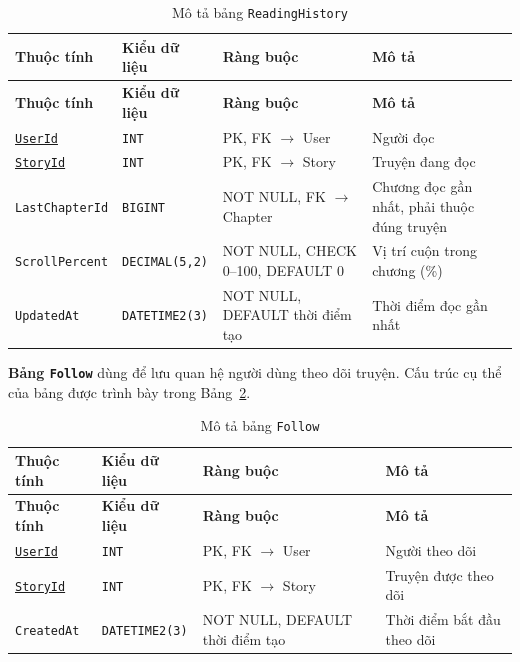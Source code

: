 {\small
\renewcommand{\arraystretch}{1.2}
\begin{longtable}{|>{\raggedright\arraybackslash}p{3.1cm}|>{\raggedright\arraybackslash}p{2.7cm}|>{\raggedright\arraybackslash}p{4.0cm}|>{\raggedright\arraybackslash}p{5.4cm}|}
\caption{Mô tả bảng \texttt{ReadingHistory}}\label{tab:db-reading-history}\\
\hline
\textbf{Thuộc tính} & \textbf{Kiểu dữ liệu} & \textbf{Ràng buộc} & \textbf{Mô tả} \\ \hline
\endfirsthead
\hline
\textbf{Thuộc tính} & \textbf{Kiểu dữ liệu} & \textbf{Ràng buộc} & \textbf{Mô tả} \\ \hline
\endhead
\underline{\texttt{UserId}} & \texttt{INT} & PK, FK $\rightarrow$ User & Người đọc \\ \hline
\underline{\texttt{StoryId}} & \texttt{INT} & PK, FK $\rightarrow$ Story & Truyện đang đọc \\ \hline
\texttt{LastChapterId} & \texttt{BIGINT} & NOT NULL, FK $\rightarrow$ Chapter & Chương đọc gần nhất, phải thuộc đúng truyện \\ \hline
\texttt{ScrollPercent} & \texttt{DECIMAL(5,2)} & NOT NULL, CHECK 0--100, DEFAULT 0 & Vị trí cuộn trong chương (\%) \\ \hline
\texttt{UpdatedAt} & \texttt{DATETIME2(3)} & NOT NULL, DEFAULT thời điểm tạo & Thời điểm đọc gần nhất \\ \hline
\end{longtable}
}

\textbf{Bảng \texttt{Follow}} dùng để lưu quan hệ người dùng theo dõi truyện. Cấu trúc cụ thể của bảng được trình bày trong Bảng~\ref{tab:db-follow}.


{\small
\renewcommand{\arraystretch}{1.2}
\begin{longtable}{|>{\raggedright\arraybackslash}p{3.1cm}|>{\raggedright\arraybackslash}p{2.7cm}|>{\raggedright\arraybackslash}p{4.0cm}|>{\raggedright\arraybackslash}p{5.4cm}|}
\caption{Mô tả bảng \texttt{Follow}}\label{tab:db-follow}\\
\hline
\textbf{Thuộc tính} & \textbf{Kiểu dữ liệu} & \textbf{Ràng buộc} & \textbf{Mô tả} \\ \hline
\endfirsthead
\hline
\textbf{Thuộc tính} & \textbf{Kiểu dữ liệu} & \textbf{Ràng buộc} & \textbf{Mô tả} \\ \hline
\endhead
\underline{\texttt{UserId}} & \texttt{INT} & PK, FK $\rightarrow$ User & Người theo dõi \\ \hline
\underline{\texttt{StoryId}} & \texttt{INT} & PK, FK $\rightarrow$ Story & Truyện được theo dõi \\ \hline
\texttt{CreatedAt} & \texttt{DATETIME2(3)} & NOT NULL, DEFAULT thời điểm tạo & Thời điểm bắt đầu theo dõi \\ \hline
\end{longtable}
}

